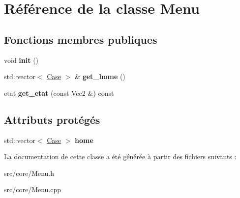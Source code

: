 \hypertarget{class_menu}{}\section{Référence de la classe Menu}
\label{class_menu}
\subsection*{Fonctions membres publiques}
\begin{DoxyCompactItemize}
\item 
\mbox{\label{class_menu_a342d2a526a850dbf2d1aecd830b91287}} 
void {\bfseries init} ()
\item 
\mbox{\label{class_menu_aafc4bb101b8d084a36f194dca209acdc}} 
std\+::vector$<$ \mbox{\hyperlink{class_case}{Case}} $>$ \& {\bfseries get\+\_\+home} ()
\item 
\mbox{\label{class_menu_a15725a33a3328e17bb610ab2b133b592}} 
etat {\bfseries get\+\_\+etat} (const Vec2 \&) const
\end{DoxyCompactItemize}
\subsection*{Attributs protégés}
\begin{DoxyCompactItemize}
\item 
\mbox{\label{class_menu_a718d3d68981e6f1e751bb9ed6dab8f0b}} 
std\+::vector$<$ \mbox{\hyperlink{class_case}{Case}} $>$ {\bfseries home}
\end{DoxyCompactItemize}


La documentation de cette classe a été générée à partir des fichiers suivants \+:\begin{DoxyCompactItemize}
\item 
src/core/Menu.\+h\item 
src/core/Menu.\+cpp\end{DoxyCompactItemize}
